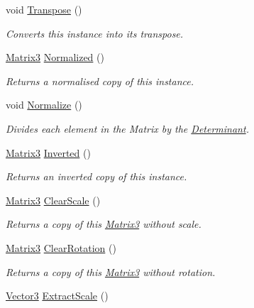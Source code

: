 \begin{DoxyCompactItemize}
void \hyperlink{struct_open_t_k_1_1_matrix3_a35815fa4d1fb072e178b27a41ef20172}{Transpose} ()
\begin{DoxyCompactList}\small\item\em Converts this instance into its transpose. \end{DoxyCompactList}\item 
\hyperlink{struct_open_t_k_1_1_matrix3}{Matrix3} \hyperlink{struct_open_t_k_1_1_matrix3_a8ef09c9743e8a8bb164487f248a687fb}{Normalized} ()
\begin{DoxyCompactList}\small\item\em Returns a normalised copy of this instance. \end{DoxyCompactList}\item 
void \hyperlink{struct_open_t_k_1_1_matrix3_a42c0844de96a340cd971de3b661076bf}{Normalize} ()
\begin{DoxyCompactList}\small\item\em Divides each element in the Matrix by the \hyperlink{struct_open_t_k_1_1_matrix3_aeea92fa70019761049f0294d2c41eab5}{Determinant}. \end{DoxyCompactList}\item 
\hyperlink{struct_open_t_k_1_1_matrix3}{Matrix3} \hyperlink{struct_open_t_k_1_1_matrix3_adf5bb71401c92565a6c63de63e6de1c1}{Inverted} ()
\begin{DoxyCompactList}\small\item\em Returns an inverted copy of this instance. \end{DoxyCompactList}\item 
\hyperlink{struct_open_t_k_1_1_matrix3}{Matrix3} \hyperlink{struct_open_t_k_1_1_matrix3_a283835ce0e681346f53678b1be30bb7a}{Clear\-Scale} ()
\begin{DoxyCompactList}\small\item\em Returns a copy of this \hyperlink{struct_open_t_k_1_1_matrix3}{Matrix3} without scale. \end{DoxyCompactList}\item 
\hyperlink{struct_open_t_k_1_1_matrix3}{Matrix3} \hyperlink{struct_open_t_k_1_1_matrix3_a02f8cf2d97f009ff3f0717379f002afa}{Clear\-Rotation} ()
\begin{DoxyCompactList}\small\item\em Returns a copy of this \hyperlink{struct_open_t_k_1_1_matrix3}{Matrix3} without rotation. \end{DoxyCompactList}\item 
\hyperlink{struct_open_t_k_1_1_vector3}{Vector3} \hyperlink{struct_open_t_k_1_1_matrix3_af26a2b980285d377cb0df89e846fe4b1}{Extract\-Scale} ()

\end{DoxyCompactItemize}
